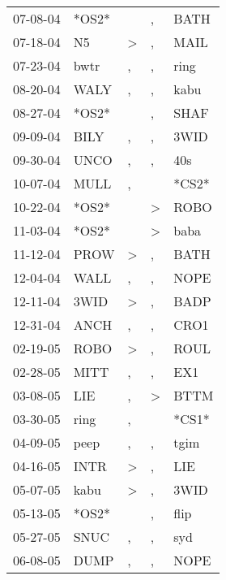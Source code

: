 \begin{supertabular}{lllll}
 07-08-04 &  *OS2* &                  &                , &   BATH \\
 07-18-04 &     N5 &     \textgreater &                , &   MAIL \\
 07-23-04 &   bwtr &                , &                , &   ring \\
 08-20-04 &   WALY &                , &                , &   kabu \\
 08-27-04 &  *OS2* &                  &                , &   SHAF \\
 09-09-04 &   BILY &                , &                , &   3WID \\
 09-30-04 &   UNCO &                , &                , &    40s \\
 10-07-04 &   MULL &                , &                  &  *CS2* \\
 10-22-04 &  *OS2* &                  &     \textgreater &   ROBO \\
 11-03-04 &  *OS2* &                  &     \textgreater &   baba \\
 11-12-04 &   PROW &     \textgreater &                , &   BATH \\
 12-04-04 &   WALL &                , &                , &   NOPE \\
 12-11-04 &   3WID &     \textgreater &                , &   BADP \\
 12-31-04 &   ANCH &                , &                , &   CRO1 \\
 02-19-05 &   ROBO &     \textgreater &                , &   ROUL \\
 02-28-05 &   MITT &                , &                , &    EX1 \\
 03-08-05 &    LIE &                , &     \textgreater &   BTTM \\
 03-30-05 &   ring &                , &                  &  *CS1* \\
 04-09-05 &   peep &                , &                , &   tgim \\
 04-16-05 &   INTR &     \textgreater &                , &    LIE \\
 05-07-05 &   kabu &     \textgreater &                , &   3WID \\
 05-13-05 &  *OS2* &                  &                , &   flip \\
 05-27-05 &   SNUC &                , &                , &    syd \\
 06-08-05 &   DUMP &                , &                , &   NOPE \\

\end{supertabular}
